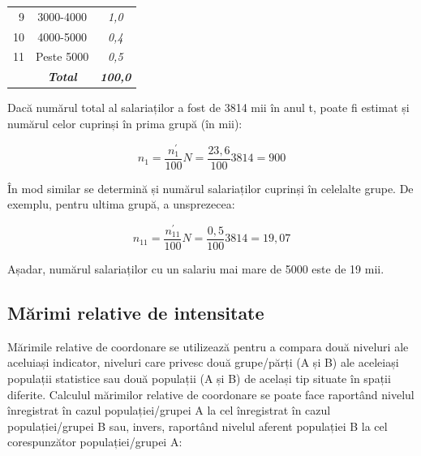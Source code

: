 \documentclass[
  11pt,
  b5paper,
  nottoc]{book}
\begin{document}
\begin{table}[!h]
\begin{tabular}{@{}rcc@{}}
9                    & 3000-4000                                                                                 & \textit{1,0}                                                                                     \\
10                   & 4000-5000                                                                                 & \textit{0,4}                                                                                     \\
11                   & Peste 5000                                                                                & \textit{0,5}                                                                                     \\
\multicolumn{1}{l}{} & \textit{\textbf{Total}}                                                                   & \textit{\textbf{100,0}}                                                                          \\ \bottomrule
\end{tabular}
\end{table}    

Dacă numărul total al salariaților a fost de 3814 mii în anul t, poate
fi estimat și numărul celor cuprinși în prima grupă (în mii):

\[n_{1} = \frac{n^{'}_{1}}{100}N =\frac{23,6}{100}3814 = 900\]

În mod similar se determină și numărul salariaților cuprinși în
celelalte grupe. De exemplu, pentru ultima grupă, a unsprezecea:

\[n_{11} = \frac{n^{'}_{11}}{100}N =\frac{0,5}{100}3814 = 19,07\]

Așadar, numărul salariaților cu un salariu mai mare de 5000 este de 19
mii.

\hypertarget{mux103rimi-relative-de-intensitate}{%
\subsection{Mărimi relative de
intensitate}\label{mux103rimi-relative-de-intensitate}}

Mărimile relative de coordonare se utilizează pentru a compara două
niveluri ale aceluiași indicator, niveluri care privesc două grupe/părți
(A și B) ale aceleiași populații statistice sau două populații (A și B)
de același tip situate în spații diferite. Calculul mărimilor relative
de coordonare se poate face raportând nivelul înregistrat în cazul
populației/grupei A la cel înregistrat în cazul populației/grupei B sau,
invers, raportând nivelul aferent populației B la cel corespunzător
populației/grupei A:
\end{document}
